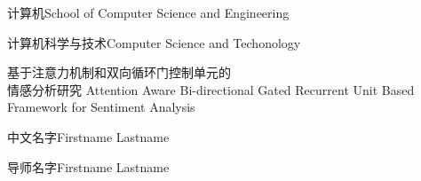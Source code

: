 
\school
{计算机}{School of Computer Science and Engineering}

\major
{计算机科学与技术}{Computer Science and Techonology}

\thesistitle
{基于注意力机制和双向循环门控制单元的\\情感分析研究}
{}
{Attention Aware Bi-directional Gated Recurrent Unit Based Framework for Sentiment Analysis}
{}

\thesisauthor
{中文名字}{Firstname Lastname}

\teacher
{导师名字}{Firstname Lastname}






